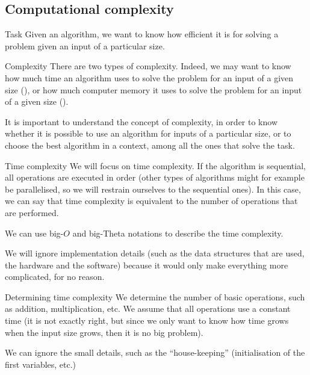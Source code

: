 \documentclass[a4paper]{article}
\begin{document}
\subsection{Computational complexity}
\begin{parag}{Task}
    Given an algorithm, we want to know how efficient it is for solving a problem given an input of a particular size.
\end{parag}

\begin{parag}{Complexity}
    There are two types of complexity. Indeed, we may want to know how much time an algorithm uses to solve the problem for an input of a given size (), or how much computer memory it uses to solve the problem for an input of a given size ().

    It is important to understand the concept of complexity, in order to know whether it is possible to use an algorithm for inputs of a particular size, or to choose the best algorithm in a context, among all the ones that solve the task.
\end{parag}

\begin{parag}{Time complexity}
    We will focus on time complexity. If the algorithm is sequential, all operations are executed in order (other types of algorithms might for example be parallelised, so we will restrain ourselves to the sequential ones). In this case, we can say that time complexity is equivalent to the number of operations that are performed.

    We can use big-$O$ and big-Theta notations to describe the time complexity.

    We will ignore implementation details (such as the data structures that are used, the hardware and the software) because it would only make everything more complicated, for no reason.
\end{parag}

\begin{parag}{Determining time complexity}
    We determine the number of basic operations, such as addition, multiplication, etc. We assume that all operations use a constant time (it is not exactly right, but since we only want to know how time grows when the input size grows, then it is no big problem).

    We can ignore the small details, such as the ``house-keeping'' (initialisation of the first variables, etc.)
\end{parag}
\end{document}
